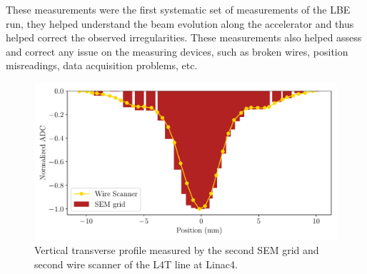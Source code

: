 These measurements were the first systematic set of measurements of the LBE run, they helped understand the beam evolution along the accelerator and thus helped correct the observed irregularities. These measurements also helped assess and correct any issue on the measuring devices, such as broken wires, position misreadings, data acquisition problems, etc.  

\begin{figure}[h]
    \centering
    \includegraphics[width=0.6\columnwidth]{VertProf/VertProf.pdf}
    \caption{Vertical transverse profile measured by the second SEM grid and second wire scanner of the L4T line at Linac4.}
    \label{fig:VertProf}
\end{figure}




